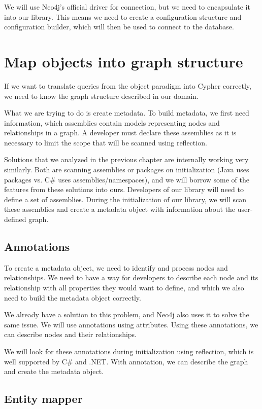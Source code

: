 We will use Neo4j's official driver for connection, but we need to encapsulate it into our library. This means we need to create a configuration structure and configuration builder, which will then be used to connect to the database.

\section {Map objects into graph structure}

If we want to translate queries from the object paradigm into Cypher correctly, we need to know the graph structure described in our domain.

What we are trying to do is create metadata. To build metadata, we first need information, which assemblies contain models representing nodes and relationships in a graph. A developer must declare these assemblies as it is necessary to limit the scope that will be scanned using reflection.

Solutions that we analyzed in the previous chapter are internally working very similarly. Both are scanning assemblies or packages on initialization (Java uses packages vs. C\# uses assemblies/namespaces), and we will borrow some of the features from these solutions into ours.
Developers of our library will need to define a set of assemblies. During the initialization of our library, we will scan these assemblies and create a metadata object with information about the user-defined graph.

\subsection {Annotations}

To create a metadata object, we need to identify and process nodes and relationships. We need to have a way for developers to describe each node and its relationship with all properties they would want to define, and which we also need to build the metadata object correctly.

We already have a solution to this problem, and Neo4j also uses it to solve the same issue. We will use annotations using attributes. Using these annotations, we can describe nodes and their relationships.

We will look for these annotations during initialization using reflection, which is well supported by C\# and .NET. With annotation, we can describe the graph and create the metadata object.

\subsection {Entity mapper}

